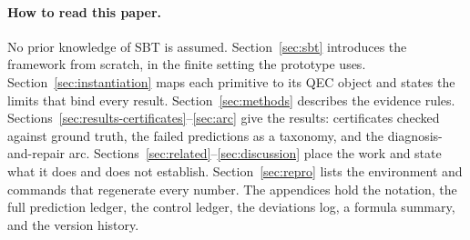 \paragraph{How to read this paper.} No prior knowledge of SBT is assumed. Section~\ref{sec:sbt} introduces the framework from scratch, in the finite setting the prototype uses. Section~\ref{sec:instantiation} maps each primitive to its QEC object and states the limits that bind every result. Section~\ref{sec:methods} describes the evidence rules. Sections~\ref{sec:results-certificates}--\ref{sec:arc} give the results: certificates checked against ground truth, the failed predictions as a taxonomy, and the diagnosis-and-repair arc. Sections~\ref{sec:related}--\ref{sec:discussion} place the work and state what it does and does not establish. Section~\ref{sec:repro} lists the environment and commands that regenerate every number. The appendices hold the notation, the full prediction ledger, the control ledger, the deviations log, a formula summary, and the version history.
